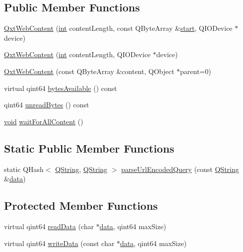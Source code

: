 \subsection*{Public Member Functions}
\begin{DoxyCompactItemize}
\item 
\hyperlink{class_qxt_web_content_af595133f85abc4133aed059084caa9f7}{Qxt\-Web\-Content} (\hyperlink{ioapi_8h_a787fa3cf048117ba7123753c1e74fcd6}{int} content\-Length, const Q\-Byte\-Array \&\hyperlink{glext_8h_a13be19455586e95d5a42ed8f054afad2}{start}, Q\-I\-O\-Device $\ast$device)
\item 
\hyperlink{class_qxt_web_content_a4b90c84b5d6750fcf6f48d4ac3e4d5d2}{Qxt\-Web\-Content} (\hyperlink{ioapi_8h_a787fa3cf048117ba7123753c1e74fcd6}{int} content\-Length, Q\-I\-O\-Device $\ast$device)
\item 
\hyperlink{class_qxt_web_content_ab883b55b2584f6bbd470e48c97f68f31}{Qxt\-Web\-Content} (const Q\-Byte\-Array \&content, Q\-Object $\ast$parent=0)
\item 
virtual qint64 \hyperlink{class_qxt_web_content_a398904ee756afd5e78054d82bccea844}{bytes\-Available} () const 
\item 
qint64 \hyperlink{class_qxt_web_content_a6fbebd100adfc2e8d88efee1bb51a23e}{unread\-Bytes} () const 
\item 
\hyperlink{group___u_a_v_objects_plugin_ga444cf2ff3f0ecbe028adce838d373f5c}{void} \hyperlink{class_qxt_web_content_ab2cbb4ed59f43e058f3a2539bf7a451f}{wait\-For\-All\-Content} ()
\end{DoxyCompactItemize}
\subsection*{Static Public Member Functions}
\begin{DoxyCompactItemize}
\item 
static Q\-Hash$<$ \hyperlink{group___u_a_v_objects_plugin_gab9d252f49c333c94a72f97ce3105a32d}{Q\-String}, \hyperlink{group___u_a_v_objects_plugin_gab9d252f49c333c94a72f97ce3105a32d}{Q\-String} $>$ \hyperlink{class_qxt_web_content_a9434aa40d18095d8dfb5bbcbaa54f86f}{parse\-Url\-Encoded\-Query} (const \hyperlink{group___u_a_v_objects_plugin_gab9d252f49c333c94a72f97ce3105a32d}{Q\-String} \&\hyperlink{glext_8h_a8850df0785e6fbcc2351af3b686b8c7a}{data})
\end{DoxyCompactItemize}
\subsection*{Protected Member Functions}
\begin{DoxyCompactItemize}
\item 
virtual qint64 \hyperlink{class_qxt_web_content_a5f4501f3fa1979fbb2ebf65390780d57}{read\-Data} (char $\ast$\hyperlink{glext_8h_a8850df0785e6fbcc2351af3b686b8c7a}{data}, qint64 max\-Size)
\item 
virtual qint64 \hyperlink{class_qxt_web_content_af6c40cf2e3c95ce9ae1136e34e5f8f20}{write\-Data} (const char $\ast$\hyperlink{glext_8h_a8850df0785e6fbcc2351af3b686b8c7a}{data}, qint64 max\-Size)
\end{DoxyCompactItemize}


